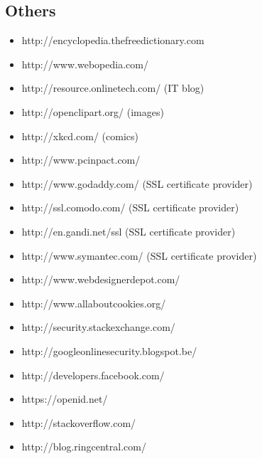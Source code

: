 \subsection{Others}
\begin{itemize}
\item http://encyclopedia.thefreedictionary.com
\item http://www.webopedia.com/

\item http://resource.onlinetech.com/ (IT blog)
\item http://openclipart.org/ (images)
\item http://xkcd.com/ (comics) 
\item http://www.pcinpact.com/

\item http://www.godaddy.com/ (SSL certificate provider)
\item http://ssl.comodo.com/ (SSL certificate provider)
\item http://en.gandi.net/ssl (SSL certificate provider)
\item http://www.symantec.com/ (SSL certificate provider)

\item http://www.webdesignerdepot.com/
\item http://www.allaboutcookies.org/
\item http://security.stackexchange.com/
\item http://googleonlinesecurity.blogspot.be/
\item http://developers.facebook.com/
\item https://openid.net/
\item http://stackoverflow.com/
\item http://blog.ringcentral.com/

\end{itemize}
